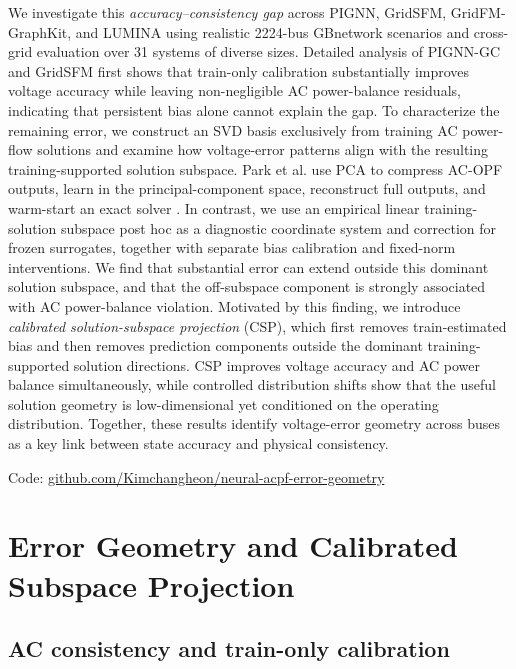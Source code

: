 \documentclass{article}
\begin{document}
We investigate this \emph{accuracy--consistency gap} across PIGNN, GridSFM,
GridFM-GraphKit, and LUMINA using realistic 2224-bus GBnetwork scenarios and
cross-grid evaluation over 31 systems of diverse sizes.
Detailed analysis of PIGNN-GC and GridSFM first shows that train-only calibration
substantially improves voltage accuracy while leaving non-negligible AC
power-balance residuals, indicating that persistent bias alone cannot explain the gap.
To characterize the remaining error, we construct an SVD basis exclusively from
training AC power-flow solutions and examine how voltage-error patterns align with
the resulting training-supported solution subspace.
Park et al. use PCA to compress AC-OPF outputs, learn in the principal-component
space, reconstruct full outputs, and warm-start an exact solver
\cite{park2024compact}. In contrast, we use an empirical linear training-solution
subspace post hoc as a diagnostic coordinate system and correction for frozen
surrogates, together with separate bias calibration and fixed-norm interventions.
We find that substantial error can extend outside this dominant solution subspace,
and that the off-subspace component is strongly associated with AC power-balance
violation.
Motivated by this finding, we introduce \emph{calibrated solution-subspace
projection} (CSP), which first removes train-estimated bias and then removes
prediction components outside the dominant training-supported solution directions.
CSP improves voltage accuracy and AC power balance simultaneously, while controlled
distribution shifts show that the useful solution geometry is low-dimensional yet
conditioned on the operating distribution.
Together, these results identify voltage-error geometry across buses as a key link
between state accuracy and physical consistency.

Code: \href{http://github.com/Kimchangheon/neural-acpf-error-geometry}{github.com/Kimchangheon/neural-acpf-error-geometry}

\section{Error Geometry and Calibrated Subspace Projection}
\label{sec:method}

\subsection{AC consistency and train-only calibration}
\end{document}
